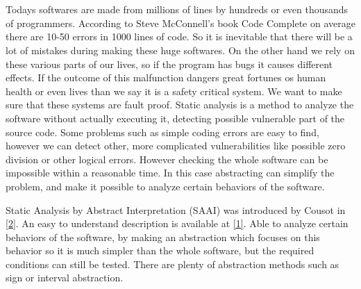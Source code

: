 \chapter{\bevezetes}
\label{sec:intro}

Todays softwares are made from millions of lines by hundreds or even thousands of programmers. According to Steve McConnell's book Code Complete on average there are 10-50 errors in 1000 lines of code. So it is inevitable that there will be a lot of mistakes during making these huge softwares. On the other hand we rely on these various parts of our lives, so if the program has bugs it causes different effects. If the outcome of this malfunction dangers great fortunes os human health or even lives than we say it is a safety critical system. We want to make sure that these systems are fault proof. Static analysis is a method to analyze the software without actually executing it, detecting possible vulnerable part of the source code. Some problems such as simple coding errors are easy to find, however we can detect other, more complicated vulnerabilities like possible zero division or other logical errors. However checking the whole software can be impossible within a reasonable time. In this case abstracting can simplify the problem, and make it possible to analyze certain behaviors of the software. 

Static Analysis by Abstract Interpretation (SAAI) was introduced by Cousot in \hyperref[sec:ref]{[2]}. An easy to understand description is available at \hyperref[sec:ref]{[1]}. Able to analyze certain behaviors of the software, by making an abstraction which focuses on this behavior so it is much simpler than the whole software, but the required conditions can still be tested. There are plenty of abstraction methods such as sign or interval abstraction. 




